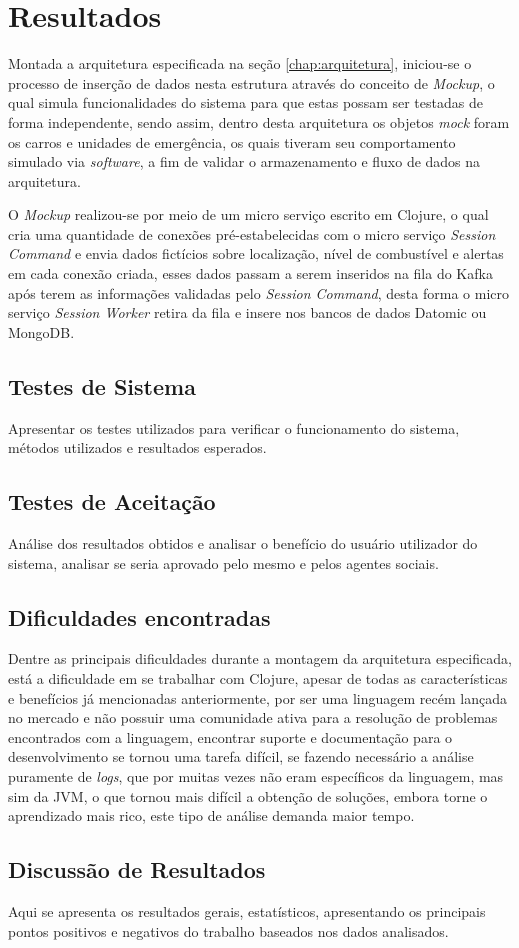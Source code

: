 \chapter{Resultados}
\label{chap:analiseresultados}
Montada a arquitetura especificada na seção \ref{chap:arquitetura}, iniciou-se o processo de inserção de dados nesta estrutura através do conceito de \textit{Mockup}, o qual simula funcionalidades do sistema para que estas possam ser testadas de forma independente, sendo assim, dentro desta arquitetura os objetos \textit{mock} foram os carros e unidades de emergência, os quais tiveram seu comportamento simulado via \textit{software}, a fim de validar o armazenamento e fluxo de dados na arquitetura.

O \textit{Mockup} realizou-se por meio de um micro serviço escrito em Clojure, o qual cria uma quantidade de conexões pré-estabelecidas com o micro serviço \textit{Session Command} e envia dados fictícios sobre localização, nível de combustível e alertas em cada conexão criada, esses dados passam a serem inseridos na fila do Kafka após terem as informações validadas pelo \textit{Session Command}, desta forma o micro serviço \textit{Session Worker} retira da fila e insere nos bancos de dados Datomic ou MongoDB.


\section{Testes de Sistema}
\label{sec:testessistema}
Apresentar os testes utilizados para verificar o funcionamento do sistema, métodos utilizados e resultados esperados.

\section{Testes de Aceitação}
\label{sec:testesaceitacao}
Análise dos resultados obtidos e analisar o benefício do usuário utilizador do sistema, analisar se seria aprovado pelo mesmo e pelos agentes sociais.

\section{Dificuldades encontradas}
Dentre as principais dificuldades durante a montagem da arquitetura especificada, está a dificuldade em se trabalhar com Clojure, apesar de todas as características e benefícios já mencionadas anteriormente, por ser uma linguagem recém lançada no mercado e não possuir uma comunidade ativa para a resolução de problemas encontrados com a linguagem, encontrar suporte e documentação para o desenvolvimento se tornou uma tarefa difícil, se fazendo necessário a análise puramente de \textit{logs}, que por muitas vezes não eram específicos da linguagem, mas sim da JVM, o que tornou mais difícil a obtenção de soluções, embora torne o aprendizado mais rico, este tipo de análise demanda maior tempo.



\section{Discussão de Resultados}
\label{sec:discussãoresultados}
Aqui se apresenta os resultados gerais, estatísticos, apresentando os principais pontos positivos e negativos do trabalho baseados nos dados analisados.